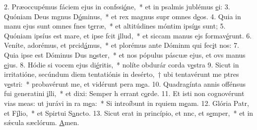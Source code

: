 2. Præoccupémus fáciem ejus in confssi\uline{ó}ne,~* et in psalmis jublémus \uline{e}i:
3. Quóniam Deus mgnus D\uline{ó}minus,~* et rex magnus supr omnes d\uline{e}os.
4. Quia in manu ejus sunt omnes fnes t\uline{e}rræ,~* et altitúdines móntim ipsí\uline{u}s sunt;
5. Quóniam ipsíus est mare, et ipse fcit \uline{i}llud,~* et siccam manus ejs formav\uline{é}runt.
6. Veníte, adorémus, et prcid\uline{á}mus,~* et plorémus ante Dóminm qui fec\uline{i}t nos:
7. Quia ipse est Dóminus Dus n\uline{o}ster,~* et nos pópulus páscuæ ejus, et ovs manus \uline{e}jus.
8. Hódie si vocem ejus di\uline{é}ritis,~* nolíte obdurár corda v\uline{e}stra
9. Sicut in irritatióne, secúndum diem tentatiónis in desérto,~† ubi tentavérunt me ptres v\uline{e}stri:~* probavérunt me, et vidérunt pera m\uline{e}a.
10. Quadragínta annis offénsus fui generatini \uline{i}lli,~* et dixi: Semper h errant c\uline{o}rde.
11. Et isti non cognovérunt vias meas: ut jurávi in ra m\uline{e}a:~* Si introíbunt in rquiem m\uline{e}am.
12. Glória Patr, et F\uline{í}lio,~* et Spirtui S\uline{a}ncto.
13. Sicut erat in princípio, et nnc, et s\uline{e}mper,~* et in sǽcula sæclórum. \uline{A}men.
